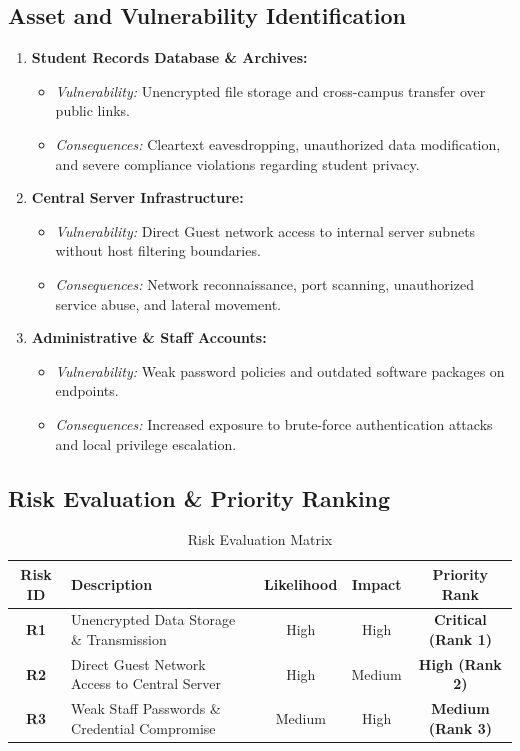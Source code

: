 \documentclass[12pt,a4paper]{article}
\begin{document}
\subsection{Asset and Vulnerability Identification}
\begin{enumerate}
    \item \textbf{Student Records Database \& Archives:}
    \begin{itemize}
        \item \emph{Vulnerability:} Unencrypted file storage and cross-campus transfer over public links.
        \item \emph{Consequences:} Cleartext eavesdropping, unauthorized data modification, and severe compliance violations regarding student privacy.
    \end{itemize}
    
    \item \textbf{Central Server Infrastructure:}
    \begin{itemize}
        \item \emph{Vulnerability:} Direct Guest network access to internal server subnets without host filtering boundaries.
        \item \emph{Consequences:} Network reconnaissance, port scanning, unauthorized service abuse, and lateral movement.
    \end{itemize}
    
    \item \textbf{Administrative \& Staff Accounts:}
    \begin{itemize}
        \item \emph{Vulnerability:} Weak password policies and outdated software packages on endpoints.
        \item \emph{Consequences:} Increased exposure to brute-force authentication attacks and local privilege escalation.
    \end{itemize}
\end{enumerate}

\subsection{Risk Evaluation \& Priority Ranking}

\begin{table}[htbp]
\centering
\caption{Risk Evaluation Matrix}
\vspace{0.1cm}
\small
\begin{tabular}{@{}c l c c c@{}}
\toprule
\textbf{Risk ID} & \textbf{Description} & \textbf{Likelihood} & \textbf{Impact} & \textbf{Priority Rank} \\ \midrule
\textbf{R1} & Unencrypted Data Storage \& Transmission & High & High & \textbf{Critical (Rank 1)} \\
\textbf{R2} & Direct Guest Network Access to Central Server & High & Medium & \textbf{High (Rank 2)} \\
\textbf{R3} & Weak Staff Passwords \& Credential Compromise & Medium & High & \textbf{Medium (Rank 3)} \\ \bottomrule
\end{tabular}
\end{table}
\end{document}
